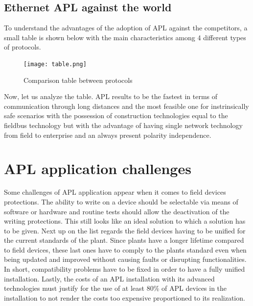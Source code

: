 \documentclass[conference]{IEEEtran}
\begin{document}
\subsection{Ethernet APL against the world}
To understand the advantages of the adoption of APL against the competitors, a small table is shown below with the main characteristics among 4 different types of protocols.
\begin{figure}[htbp]
    \centerline{\texttt{[image: table.png]}}
    \caption{Comparison table between protocols \cite{b8}}
    \label{table}
\end{figure}
Now, let us analyze the table. APL results to be the fastest in terms of communication through long distances and the most feasible one for instrinsically safe scenarios with the possession of construction technologies equal to the fieldbus technology but with the advantage of having single network technology from field to enterprise and an always present polarity independence.
\section{APL application challenges}
Some challenges of APL application appear when it comes to field devices protections. The ability to write on a device should be selectable via means of software or hardware and routine tests should allow the deactivation of the writing protections. This still looks like an ideal solution to which a solution has to be given. Next up on the list regards the field devices having to be unified for the current standards of the plant. Since plants have a longer lifetime compared to field devices, these last ones have to comply to the plants standard even when being updated and improved without causing faults or disrupting functionalities. In short, compatibility problems have to be fixed in order to have a fully unified installation. Lastly, the costs of an APL installation with its advanced technologies must justify for the use of at least 80\% of APL devices in the installation to not render the costs too expensive proportioned to its realization.\cite{b10}
\end{document}
